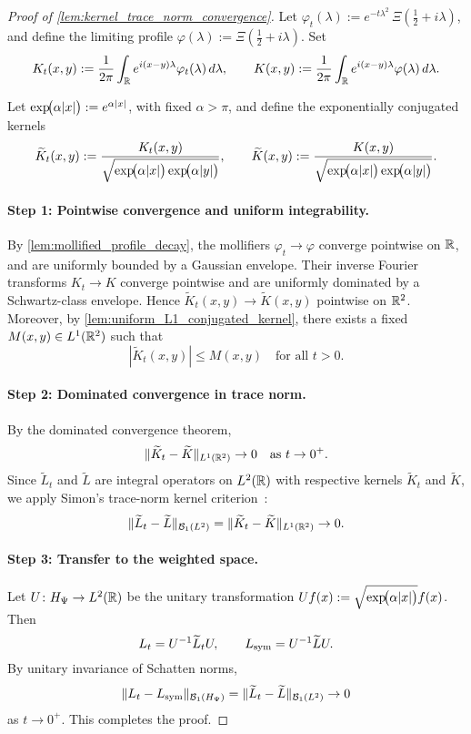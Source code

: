 \begin{proof}[Proof of \cref{lem:kernel_trace_norm_convergence}]
Let \( \varphi_t(\lambda) := e^{-t\lambda^2} \, \Xi\left( \tfrac{1}{2} + i\lambda \right) \), and define the limiting profile \( \varphi(\lambda) := \Xi\left( \tfrac{1}{2} + i\lambda \right) \). Set
\[
K_t(x,y) := \frac{1}{2\pi} \int_{\mathbb{R}} e^{i(x - y)\lambda} \varphi_t(\lambda)\, d\lambda, \qquad
K(x,y) := \frac{1}{2\pi} \int_{\mathbb{R}} e^{i(x - y)\lambda} \varphi(\lambda)\, d\lambda.
\]

Let \( \exp\!\bigl(\alpha |x|\bigr) := e^{\alpha |x|} \), with fixed \( \alpha > \pi \), and define the exponentially conjugated kernels
\[
\widetilde{K}_t(x,y) := \frac{K_t(x,y)}{\sqrt{\exp\!\bigl(\alpha |x|\bigr) \exp\!\bigl(\alpha |y|\bigr)}}, \qquad
\widetilde{K}(x,y) := \frac{K(x,y)}{\sqrt{\exp\!\bigl(\alpha |x|\bigr) \exp\!\bigl(\alpha |y|\bigr)}}.
\]

\paragraph{Step 1: Pointwise convergence and uniform integrability.}
By \cref{lem:mollified_profile_decay}, the mollifiers \( \varphi_t \to \varphi \) converge pointwise on \( \mathbb{R} \), and are uniformly bounded by a Gaussian envelope. Their inverse Fourier transforms \( K_t \to K \) converge pointwise and are uniformly dominated by a Schwartz-class envelope. Hence \( \widetilde{K}_t(x,y) \to \widetilde{K}(x,y) \) pointwise on \( \mathbb{R}^2 \). Moreover, by \cref{lem:uniform_L1_conjugated_kernel}, there exists a fixed \( M(x,y) \in L^1(\mathbb{R}^2) \) such that
\[
|\widetilde{K}_t(x,y)| \le M(x,y) \quad \text{for all } t > 0.
\]

\paragraph{Step 2: Dominated convergence in trace norm.}
By the dominated convergence theorem,
\[
\| \widetilde{K}_t - \widetilde{K} \|_{L^1(\mathbb{R}^2)} \to 0 \quad \text{as } t \to 0^+.
\]
Since \( \widetilde{L}_t \) and \( \widetilde{L} \) are integral operators on \( L^2(\mathbb{R}) \) with respective kernels \( \widetilde{K}_t \) and \( \widetilde{K} \), we apply Simon’s trace-norm kernel criterion~\cite[Thm.~3.1]{Simon2005TraceIdeals}:
\[
\| \widetilde{L}_t - \widetilde{L} \|_{\mathcal{B}_1(L^2)} = \| \widetilde{K}_t - \widetilde{K} \|_{L^1(\mathbb{R}^2)} \to 0.
\]

\paragraph{Step 3: Transfer to the weighted space.}
Let \( U \colon H_{\Psi} \to L^2(\mathbb{R}) \) be the unitary transformation \( Uf(x) := \sqrt{\exp\!\bigl(\alpha |x|\bigr)} f(x) \). Then
\[
L_t = U^{-1} \widetilde{L}_t U, \qquad L_{\mathrm{sym}} = U^{-1} \widetilde{L} U.
\]
By unitary invariance of Schatten norms,
\[
\| L_t - L_{\mathrm{sym}} \|_{\mathcal{B}_1(H_{\Psi})} = \| \widetilde{L}_t - \widetilde{L} \|_{\mathcal{B}_1(L^2)} \to 0
\]
as \( t \to 0^+ \). This completes the proof.
\end{proof}
